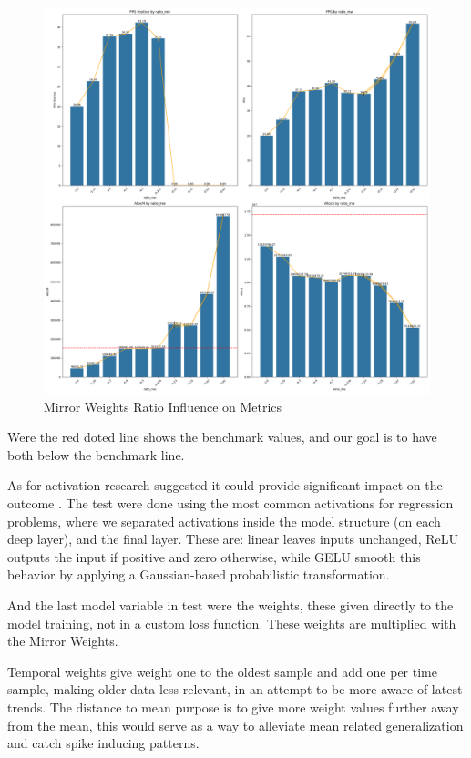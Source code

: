 \begin{figure}[H]
    \centering
    \includegraphics[width=\textwidth]{plots/article_ratio_mw.png}
    \caption{Mirror Weights Ratio Influence on Metrics}
    \label{fig:Ratio_influence_on_metrics}
  \end{figure}
Were the red doted line shows the benchmark values, and our goal is to have both below the benchmark line.\par
As for activation research suggested it could  provide significant impact on the outcome \cite{Vaswani2017,Liu2022}. The test were done using the most common activations for regression problems, where we separated activations inside the model structure (on each deep layer), and the final layer. These are: linear leaves inputs unchanged, \gls{ReLU} outputs the input if positive and zero otherwise, while \gls{GELU} smooth this behavior by applying a Gaussian-based probabilistic transformation. \par
And the last model variable in test were the weights, these given directly to the model training, not in a custom loss function. These weights are multiplied with the Mirror Weights.\par
Temporal weights give weight one to the oldest sample and add one per time sample, making older data less relevant, in an attempt to be more aware of latest trends. The distance to mean purpose is to give more weight values further away from the mean, this would serve as a way to alleviate mean related generalization and catch spike inducing patterns.\par

